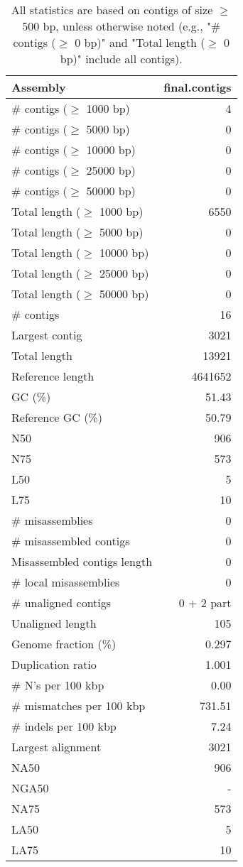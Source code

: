 \documentclass[12pt,a4paper]{article}
\begin{document}
\begin{table}[ht]
\begin{center}
\caption{All statistics are based on contigs of size $\geq$ 500 bp, unless otherwise noted (e.g., "\# contigs ($\geq$ 0 bp)" and "Total length ($\geq$ 0 bp)" include all contigs).}
\begin{tabular}{|l*{1}{|r}|}
\hline
Assembly & final.contigs \\ \hline
\# contigs ($\geq$ 1000 bp) & 4 \\ \hline
\# contigs ($\geq$ 5000 bp) & 0 \\ \hline
\# contigs ($\geq$ 10000 bp) & 0 \\ \hline
\# contigs ($\geq$ 25000 bp) & 0 \\ \hline
\# contigs ($\geq$ 50000 bp) & 0 \\ \hline
Total length ($\geq$ 1000 bp) & 6550 \\ \hline
Total length ($\geq$ 5000 bp) & 0 \\ \hline
Total length ($\geq$ 10000 bp) & 0 \\ \hline
Total length ($\geq$ 25000 bp) & 0 \\ \hline
Total length ($\geq$ 50000 bp) & 0 \\ \hline
\# contigs & 16 \\ \hline
Largest contig & 3021 \\ \hline
Total length & 13921 \\ \hline
Reference length & 4641652 \\ \hline
GC (\%) & 51.43 \\ \hline
Reference GC (\%) & 50.79 \\ \hline
N50 & 906 \\ \hline
N75 & 573 \\ \hline
L50 & 5 \\ \hline
L75 & 10 \\ \hline
\# misassemblies & 0 \\ \hline
\# misassembled contigs & 0 \\ \hline
Misassembled contigs length & 0 \\ \hline
\# local misassemblies & 0 \\ \hline
\# unaligned contigs & 0 + 2 part \\ \hline
Unaligned length & 105 \\ \hline
Genome fraction (\%) & 0.297 \\ \hline
Duplication ratio & 1.001 \\ \hline
\# N's per 100 kbp & 0.00 \\ \hline
\# mismatches per 100 kbp & 731.51 \\ \hline
\# indels per 100 kbp & 7.24 \\ \hline
Largest alignment & 3021 \\ \hline
NA50 & 906 \\ \hline
NGA50 & - \\ \hline
NA75 & 573 \\ \hline
LA50 & 5 \\ \hline
LA75 & 10 \\ \hline
\end{tabular}
\end{center}
\end{table}
\end{document}
